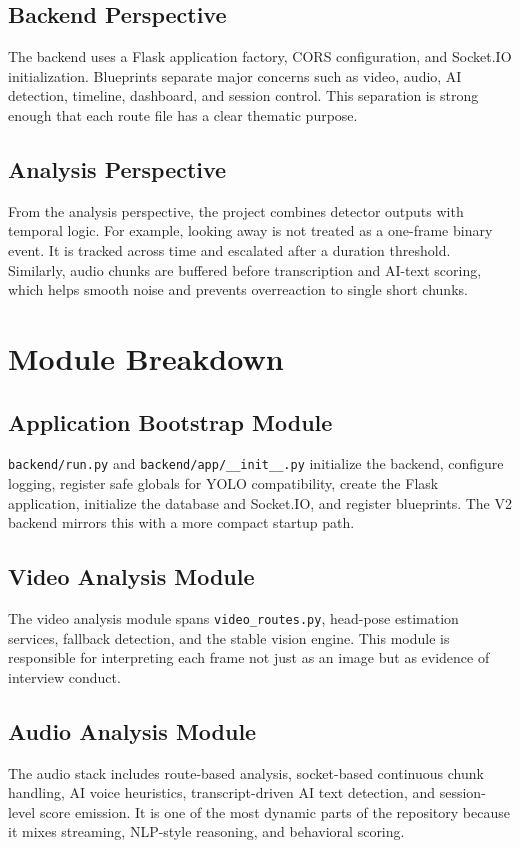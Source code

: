 \documentclass[12pt,a4paper]{extreport}
\begin{document}
\subsection{Backend Perspective}
The backend uses a Flask application factory, CORS configuration, and Socket.IO initialization. Blueprints separate major concerns such as video, audio, AI detection, timeline, dashboard, and session control. This separation is strong enough that each route file has a clear thematic purpose.

\subsection{Analysis Perspective}
From the analysis perspective, the project combines detector outputs with temporal logic. For example, looking away is not treated as a one-frame binary event. It is tracked across time and escalated after a duration threshold. Similarly, audio chunks are buffered before transcription and AI-text scoring, which helps smooth noise and prevents overreaction to single short chunks.

\section{Module Breakdown}
\subsection{Application Bootstrap Module}
\texttt{backend/run.py} and \texttt{backend/app/\_\_init\_\_.py} initialize the backend, configure logging, register safe globals for YOLO compatibility, create the Flask application, initialize the database and Socket.IO, and register blueprints. The V2 backend mirrors this with a more compact startup path.

\subsection{Video Analysis Module}
The video analysis module spans \texttt{video\_routes.py}, head-pose estimation services, fallback detection, and the stable vision engine. This module is responsible for interpreting each frame not just as an image but as evidence of interview conduct.

\subsection{Audio Analysis Module}
The audio stack includes route-based analysis, socket-based continuous chunk handling, AI voice heuristics, transcript-driven AI text detection, and session-level score emission. It is one of the most dynamic parts of the repository because it mixes streaming, NLP-style reasoning, and behavioral scoring.
\end{document}
